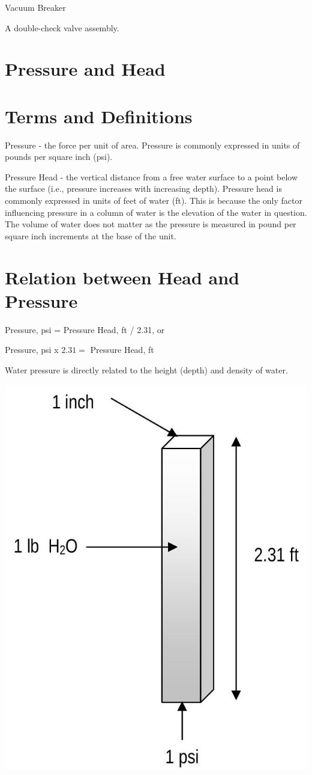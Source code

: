 \documentclass[10pt]{article}
\begin{document}
Vacuum Breaker

A double-check valve assembly.

\section{Pressure and Head}
\section{Terms and Definitions}
Pressure - the force per unit of area. Pressure is commonly expressed in units of pounds per square inch (psi).

Pressure Head - the vertical distance from a free water surface to a point below the surface (i.e., pressure increases with increasing depth). Pressure head is commonly expressed in units of feet of water (ft). This is because the only factor influencing pressure in a column of water is the elevation of the water in question. The volume of water does not matter as the pressure is measured in pound per square inch increments at the base of the unit.

\section{Relation between Head and Pressure}
Pressure, psi = Pressure Head, ft / 2.31, or

Pressure, psi x $2.31=$ Pressure Head, ft

Water pressure is directly related to the height (depth) and density of water.

\includegraphics[max width=\textwidth]{2022_10_30_098bb5f44c5986ff92a9g-28}
\end{document}
